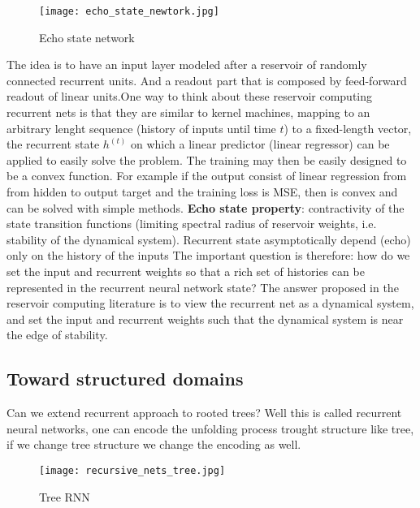 \documentclass[12pt]{book}
\begin{document}
\begin{figure}[h!]
	\centering
	\texttt{[image: echo\_state\_newtork.jpg]}
	\caption{Echo state network}
	\label{fig:echo_state_network}
\end{figure}
The idea is to have an input layer modeled after a reservoir of randomly connected recurrent units. And a readout part that is composed by feed-forward readout of linear units.\newline One way to think about these reservoir computing recurrent nets is that they are similar to kernel machines, mapping to an arbitrary lenght sequence (history of inputs until time $t$) to a fixed-length vector, the recurrent state $h^{(t)}$ on which a linear predictor (linear regressor) can be applied to easily solve the problem. The training may then be easily designed to be a convex function. For example if the output consist of linear regression from from hidden to output target and the training loss is MSE, then is convex and can be solved with simple methods.
\newline\newline
\textbf{Echo state property}: contractivity of the state transition functions (limiting spectral radius of reservoir weights, i.e. stability of the dynamical system). Recurrent state asymptotically depend (echo) only on the history of the inputs
\newline\newline
The important question is therefore: how do we set the input and recurrent
weights so that a rich set of histories can be represented in the recurrent neural
network state? The answer proposed in the reservoir computing literature is to
view the recurrent net as a dynamical system, and set the input and recurrent
weights such that the dynamical system is near the edge of stability.

\subsection{Toward structured domains}
Can we extend recurrent approach to rooted trees?\newline
Well this is called recurrent neural networks, one can encode the unfolding process trought structure like tree, if we change tree structure we change the encoding as well.

\begin{figure}[h!]
	\centering
	\texttt{[image: recursive\_nets\_tree.jpg]}
	\caption{Tree RNN}
	\label{fig:tree_rnn}
\end{figure}
\end{document}
